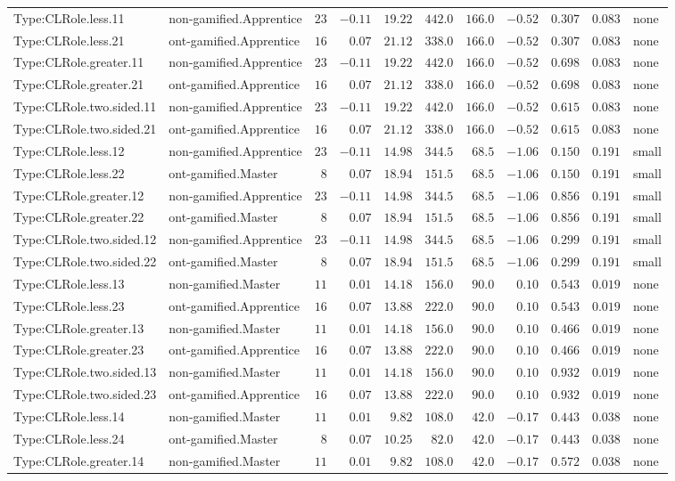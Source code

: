\documentclass[6pt,a4paper]{article}
\begin{document}
{\begin{longtable}{llrrrrrrrrl}
Type:CLRole.less.11&non-gamified.Apprentice&$23$&$-0.11$&$19.22$&$442.0$&$166.0$&$-0.52$&$0.307$&$0.083$&none\tabularnewline
Type:CLRole.less.21&ont-gamified.Apprentice&$16$&$ 0.07$&$21.12$&$338.0$&$166.0$&$-0.52$&$0.307$&$0.083$&none\tabularnewline
Type:CLRole.greater.11&non-gamified.Apprentice&$23$&$-0.11$&$19.22$&$442.0$&$166.0$&$-0.52$&$0.698$&$0.083$&none\tabularnewline
Type:CLRole.greater.21&ont-gamified.Apprentice&$16$&$ 0.07$&$21.12$&$338.0$&$166.0$&$-0.52$&$0.698$&$0.083$&none\tabularnewline
Type:CLRole.two.sided.11&non-gamified.Apprentice&$23$&$-0.11$&$19.22$&$442.0$&$166.0$&$-0.52$&$0.615$&$0.083$&none\tabularnewline
Type:CLRole.two.sided.21&ont-gamified.Apprentice&$16$&$ 0.07$&$21.12$&$338.0$&$166.0$&$-0.52$&$0.615$&$0.083$&none\tabularnewline
Type:CLRole.less.12&non-gamified.Apprentice&$23$&$-0.11$&$14.98$&$344.5$&$ 68.5$&$-1.06$&$0.150$&$0.191$&small\tabularnewline
Type:CLRole.less.22&ont-gamified.Master&$ 8$&$ 0.07$&$18.94$&$151.5$&$ 68.5$&$-1.06$&$0.150$&$0.191$&small\tabularnewline
Type:CLRole.greater.12&non-gamified.Apprentice&$23$&$-0.11$&$14.98$&$344.5$&$ 68.5$&$-1.06$&$0.856$&$0.191$&small\tabularnewline
Type:CLRole.greater.22&ont-gamified.Master&$ 8$&$ 0.07$&$18.94$&$151.5$&$ 68.5$&$-1.06$&$0.856$&$0.191$&small\tabularnewline
Type:CLRole.two.sided.12&non-gamified.Apprentice&$23$&$-0.11$&$14.98$&$344.5$&$ 68.5$&$-1.06$&$0.299$&$0.191$&small\tabularnewline
Type:CLRole.two.sided.22&ont-gamified.Master&$ 8$&$ 0.07$&$18.94$&$151.5$&$ 68.5$&$-1.06$&$0.299$&$0.191$&small\tabularnewline
Type:CLRole.less.13&non-gamified.Master&$11$&$ 0.01$&$14.18$&$156.0$&$ 90.0$&$ 0.10$&$0.543$&$0.019$&none\tabularnewline
Type:CLRole.less.23&ont-gamified.Apprentice&$16$&$ 0.07$&$13.88$&$222.0$&$ 90.0$&$ 0.10$&$0.543$&$0.019$&none\tabularnewline
Type:CLRole.greater.13&non-gamified.Master&$11$&$ 0.01$&$14.18$&$156.0$&$ 90.0$&$ 0.10$&$0.466$&$0.019$&none\tabularnewline
Type:CLRole.greater.23&ont-gamified.Apprentice&$16$&$ 0.07$&$13.88$&$222.0$&$ 90.0$&$ 0.10$&$0.466$&$0.019$&none\tabularnewline
Type:CLRole.two.sided.13&non-gamified.Master&$11$&$ 0.01$&$14.18$&$156.0$&$ 90.0$&$ 0.10$&$0.932$&$0.019$&none\tabularnewline
Type:CLRole.two.sided.23&ont-gamified.Apprentice&$16$&$ 0.07$&$13.88$&$222.0$&$ 90.0$&$ 0.10$&$0.932$&$0.019$&none\tabularnewline
Type:CLRole.less.14&non-gamified.Master&$11$&$ 0.01$&$ 9.82$&$108.0$&$ 42.0$&$-0.17$&$0.443$&$0.038$&none\tabularnewline
Type:CLRole.less.24&ont-gamified.Master&$ 8$&$ 0.07$&$10.25$&$ 82.0$&$ 42.0$&$-0.17$&$0.443$&$0.038$&none\tabularnewline
Type:CLRole.greater.14&non-gamified.Master&$11$&$ 0.01$&$ 9.82$&$108.0$&$ 42.0$&$-0.17$&$0.572$&$0.038$&none\tabularnewline

\end{longtable}}
\end{document}
